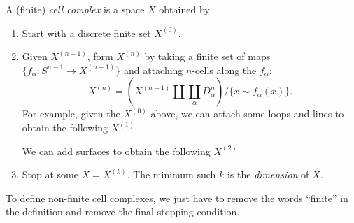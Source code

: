 \documentclass[a4paper]{article}
\begin{document}
\begin{defi}
  A (finite) \emph{cell complex} is a space $X$ obtained by
  \begin{enumerate}
    \item Start with a discrete finite set $X^{(0)}$.
      \begin{center}
      \end{center}
    \item Given $X^{(n - 1)}$, form $X^{(n)}$ by taking a finite set of maps $\{f_\alpha: S^{n - 1} \to X^{(n - 1)}\}$ and attaching $n$-cells along the $f_\alpha$:
      \[
        X^{(n)} = \left(X^{(n - 1)}\amalg \coprod_\alpha D_{\alpha}^n\right)/\{x\sim f_\alpha(x)\}.
      \]
      For example, given the $X^{(0)}$ above, we can attach some loops and lines to obtain the following $X^{(1)}$
      \begin{center}
      \end{center}
      We can add surfaces to obtain the following $X^{(2)}$
      \begin{center}
      \end{center}
    \item Stop at some $X = X^{(k)}$. The minimum such $k$ is the \emph{dimension} of $X$.
  \end{enumerate}
  To define non-finite cell complexes, we just have to remove the words ``finite'' in the definition and remove the final stopping condition.
\end{defi}
\end{document}
